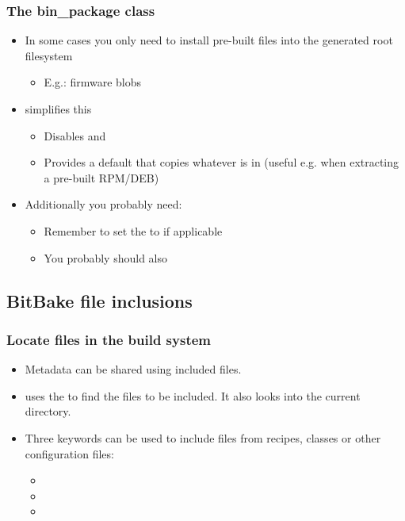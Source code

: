 \begin{frame}
  \frametitle{The bin\_package class}
  \begin{itemize}
    \item In some cases you only need to install pre-built files into the
      generated root filesystem
      \begin{itemize}
        \item E.g.: firmware blobs
      \end{itemize}
    \item {} simplifies this
      \begin{itemize}
        \item Disables  and 
        \item Provides a default  that copies whatever is
          in  (useful e.g. when extracting a pre-built RPM/DEB)
      \end{itemize}
    \item Additionally you probably need:
      \begin{itemize}
        \item Remember to set the  to  if applicable
        \item You probably should also 
      \end{itemize}
  \end{itemize}
\end{frame}

\subsection{BitBake file inclusions}

\begin{frame}
  \frametitle{Locate files in the build system}
  \begin{itemize}
    \item Metadata can be shared using included files.
    \item {} uses the  to find the files to
      be included. It also looks into the current directory.
    \item Three keywords can be used to include files from recipes,
      classes or other configuration files:
      \begin{itemize}
        \item {}
        \item {}
        \item {}
      \end{itemize}
  \end{itemize}
\end{frame}

